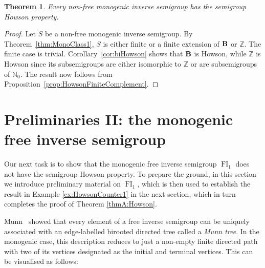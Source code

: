 \documentclass[reqno]{amsart}
\theoremstyle{plain}
\newtheorem{thm}[lem]{Theorem}
\theoremstyle{definition}
\DeclareMathOperator{\FI}{FI}
\DeclareMathOperator{\B}{\textup{\textbf{B}}}
\numberwithin{equation}{section}
\begin{document}
\begin{thm}
\label{thm:HonwsonNonFree}
Every non-free monogenic inverse semigroup has the semigroup Howson property.
\end{thm}


\begin{proof}
Let $S$ be a non-free monogenic inverse semigroup. 
By Theorem~\ref{thm:MonoClass1}, $S$ is either finite or a finite extension of $\B$ or $\mathbb{Z}$. The finite case is trivial. Corollary~\ref{cor:biHowson} shows that $\B$ is Howson, while $\mathbb{Z}$ is Howson since its subsemigroups are either isomorphic to $\mathbb{Z}$ or are subsemigroups of $\mathbb{N}_0$. The result now follows from Proposition~\ref{prop:HowsonFiniteComplement}.
\end{proof}


\section{Preliminaries II: the monogenic free inverse semigroup}
\label{sec:FI1Prelim}
Our next task is to show that the monogenic free inverse semigroup $\FI_1$ does not have the semigroup Howson property. To prepare the ground, in this section we introduce preliminary material on $\FI_1$, which is then used to establish the result in Example \ref{ex:HowsonCounter1} in the next section, which in turn completes the proof of Theorem \ref{thmA:Howson}.

 

Munn~\cite{Munn} showed that every element of a free inverse semigroup can be uniquely associated with an edge-labelled birooted directed tree called a \emph{Munn tree}. 
In the monogenic case, this description reduces to just a non-empty finite directed path 
with two of its vertices designated as the initial and terminal vertices. This can be visualised as follows: 
\end{document}
